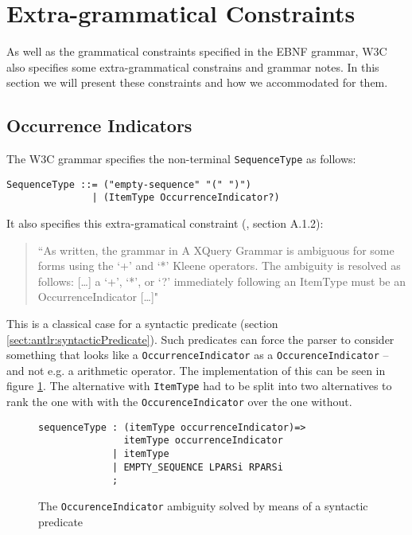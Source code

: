 \section{Extra-grammatical Constraints}
\label{sect:implementation:extraGrammatical}
As well as the grammatical constraints specified in the EBNF grammar, W3C also specifies some extra-grammatical constrains and grammar notes\cite{w3c00}. In this section we will present these constraints and how we accommodated for them. 

\subsection{Occurrence Indicators}
\label{sect:implementation:occurence}

The W3C grammar specifies the non-terminal \verb!SequenceType! as follows:
\begin{Verbatim}
SequenceType ::= ("empty-sequence" "(" ")")
               | (ItemType OccurrenceIndicator?)
\end{Verbatim}
It also specifies this extra-gramatical constraint (\cite{w3c00}, section A.1.2):
\begin{quote}
``As written, the grammar in A XQuery Grammar is ambiguous for some forms using the `+' and `*' Kleene operators. The ambiguity is resolved as follows: [\ldots] a `+', `*', or `?' immediately following an ItemType must be an OccurrenceIndicator [\ldots]"
\end{quote}

This is a classical case for a syntactic predicate (section \ref{sect:antlr:syntacticPredicate}). Such predicates can force the parser to consider something that looks like a \verb!OccurrenceIndicator! as a \verb!OccurenceIndicator! -- and not e.g. a arithmetic operator. The implementation of this can be seen in figure \ref{fig:occurrenceIndicator}. The alternative with \verb!ItemType! had to be split into two alternatives to rank the one with with the \verb!OccurenceIndicator! over the one without.

\begin{figure}[h!]
\begin{Verbatim}
sequenceType : (itemType occurrenceIndicator)=> 
               itemType occurrenceIndicator
             | itemType
             | EMPTY_SEQUENCE LPARSi RPARSi
             ;
\end{Verbatim}
\caption[The \texttt{OccurenceIndicator} ambiguity solved]{The \texttt{OccurenceIndicator} ambiguity solved by means of a syntactic predicate}
\label{fig:occurrenceIndicator}
\end{figure}

